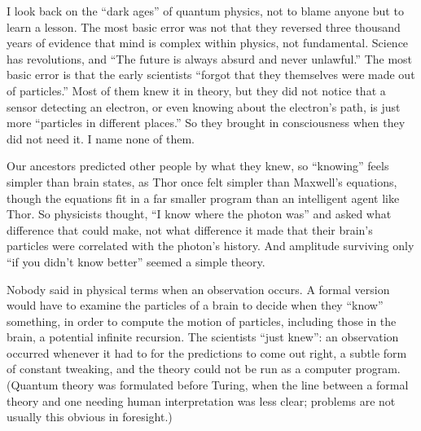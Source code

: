 
I look back on the ``dark ages'' of quantum physics, not to blame anyone but to learn a lesson. The most basic error was not that they reversed three thousand years of evidence that mind is complex within physics, not fundamental. Science has revolutions, and ``The future is always absurd and never unlawful.'' The most basic error is that the early scientists ``forgot that they themselves were made out of particles.'' Most of them knew it in theory, but they did not notice that a sensor detecting an electron, or even knowing about the electron's path, is just more ``particles in different places.'' So they brought in consciousness when they did not need it. I name none of them. 

Our ancestors predicted other people by what they knew, so ``knowing'' feels simpler than brain states, as Thor once felt simpler than Maxwell's equations, though the equations fit in a far smaller program than an intelligent agent like Thor. So physicists thought, ``I know where the photon was'' and asked what difference that could make, not what difference it made that their brain's particles were correlated with the photon's history. And amplitude surviving only ``if you didn't know better'' seemed a simple theory.

Nobody said in physical terms when an observation occurs. A formal version would have to examine the particles of a brain to decide when they ``know'' something, in order to compute the motion of particles, including those in the brain, a potential infinite recursion. The scientists ``just knew'': an observation occurred whenever it had to for the predictions to come out right, a subtle form of constant tweaking, and the theory could not be run as a computer program. (Quantum theory was formulated before Turing, when the line between a formal theory and one needing human interpretation was less clear; problems are not usually this obvious in foresight.) 

